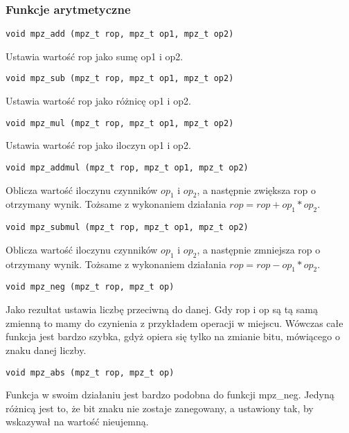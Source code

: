 \documentclass[twoside,a4paper]{book}
\begin{document}
\subsubsection{Funkcje arytmetyczne}

\begin{lstlisting}
void mpz_add (mpz_t rop, mpz_t op1, mpz_t op2)
\end{lstlisting}

Ustawia wartość rop jako sumę op1 i op2.

\begin{lstlisting}
void mpz_sub (mpz_t rop, mpz_t op1, mpz_t op2)
\end{lstlisting}

Ustawia wartość rop jako różnicę op1 i op2.

\begin{lstlisting}
void mpz_mul (mpz_t rop, mpz_t op1, mpz_t op2)
\end{lstlisting}

Ustawia wartość rop jako iloczyn op1 i op2.

\begin{lstlisting}
void mpz_addmul (mpz_t rop, mpz_t op1, mpz_t op2)
\end{lstlisting}

Oblicza wartość iloczynu czynników $op_1$ i $op_2$, a następnie zwiększa rop o otrzymany wynik. Tożsame z wykonaniem działania $rop = rop + op_1 * op_2$.

\begin{lstlisting}
void mpz_submul (mpz_t rop, mpz_t op1, mpz_t op2)
\end{lstlisting}

Oblicza wartość iloczynu czynników $op_1$ i $op_2$, a następnie zmniejsza rop o otrzymany wynik. Tożsame z wykonaniem działania $rop = rop - op_1 * op_2$.

\begin{lstlisting}
void mpz_neg (mpz_t rop, mpz_t op)
\end{lstlisting}

Jako rezultat ustawia liczbę przeciwną do danej. Gdy rop i op są tą samą zmienną to mamy do czynienia z przykładem operacji w miejscu. Wówczas całe funkcja jest bardzo szybka, gdyż opiera się tylko na zmianie bitu, mówiącego o znaku danej liczby.

\begin{lstlisting}
void mpz_abs (mpz_t rop, mpz_t op)
\end{lstlisting}

Funkcja w swoim działaniu jest bardzo podobna do funkcji mpz\_neg. Jedyną różnicą jest to, że bit znaku nie zostaje zanegowany, a ustawiony tak, by wskazywał na wartość nieujemną.
\end{document}
